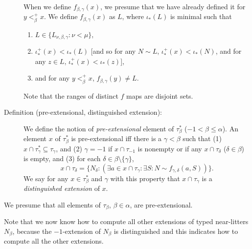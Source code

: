 \documentclass[112pt]{article}
\begin{document}
\begin{description}
 When we define $f_{\beta,\gamma}(x)$, we presume that we have already defined it for $y <^+_\beta x$.
We define $f_{\beta,\gamma}(x)$ as $L$, where $\iota_*(L)$ is minimal such that 

\begin{enumerate}
\item $L \in  \{L_{\nu,\beta,\gamma}:\nu < \mu\}$, 

\item  $\iota^+_*(x) <\iota_*(L)$ [and so for any $N \sim L$, $\iota^+_*(x) <\iota_*(N)$, and for any $z \in L$, $\iota^+_*(x) < \iota_*(z)$], 

\item and for any $y<_\beta^+ x$, $f_{\beta,\gamma}(y) \neq L$.

\end{enumerate}

Note that the ranges of distinct $f$ maps are disjoint sets.



\item[Definition (pre-extensional, distinguished extension):]  We define the notion of {\em pre-extensional\/} element of $\tau^*_\beta$ ($-1 <\beta \leq \alpha$).   An element $x$ of $\tau^*_\beta$ is pre-extensional iff there is a $\gamma<\beta$ such that (1) $x \cap \tau^*_\gamma \subseteq \tau_\gamma$, and (2) $\gamma=-1$ if
$x \cap \tau_{-1}$ is nonempty or if any $x \cap \tau_\delta$ ($\delta \in \beta$) is empty,  and (3) for each $\delta \in \beta \setminus \{\gamma\}$, $$x \cap \tau_\delta= \{N_\delta:(\exists a \in x\cap \tau_\gamma:\exists S:N \sim f_{\gamma,\delta}(a,S))\}.$$  We say for any $x \in \tau^*_\beta$ and $\gamma$ with this property that $x \cap \tau_\gamma$ is a {\em distinguished extension\/} of $x$.

\end{description}

We presume that all elements of $\tau_\beta$, $\beta\in \alpha$, are pre-extensional. 

 

Note that we now know how to compute all other extensions of typed near-litters $N_\beta$, because the $-1$-extension of $N_\beta$ is distinguished and this indicates how to compute all the other extensions.
\end{document}
